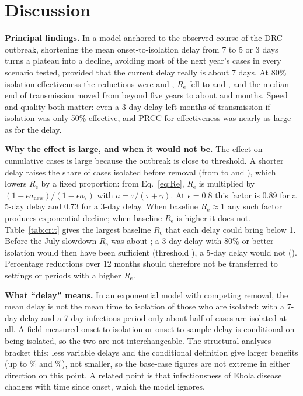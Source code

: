 \documentclass[11pt,a4paper]{article}
\newcommand{\Rt}{R_{\mathrm{e}}}
\begin{document}
\section{Discussion}
\textbf{Principal findings.} In a model anchored to the observed course of the DRC outbreak, shortening the mean onset-to-isolation delay from 7 to 5 or 3 days turns a plateau into a decline, avoiding most of the next year's cases in every scenario tested, provided that the current delay really is about 7 days. At 80\% isolation effectiveness the reductions were \pctMedEightyFive{} and \pctMedEightyThree, $\Rt$ fell to \ReMedEightyFive{} and \ReMedEightyThree, and the median end of transmission moved from beyond five years to about \durEightyFive{} and \durEightyThree{} months. Speed and quality both matter: even a 3-day delay left \durFiftyThree{} months of transmission if isolation was only 50\% effective, and PRCC for effectiveness was nearly as large as for the delay.

\textbf{Why the effect is large, and when it would not be.} The effect on cumulative cases is large because the outbreak is close to threshold. A shorter delay raises the share of cases isolated before removal (from \aIsoSeven{} to \aIsoFive{} and \aIsoThree), which lowers $\Rt$ by a fixed proportion: from Eq.~\eqref{eq:Re}, $\Rt$ is multiplied by $(1-\epsilon a_{\text{new}})/(1-\epsilon a_{7})$ with $a=\tau/(\tau+\gamma)$. At $\epsilon=0.8$ this factor is 0.89 for a 5-day delay and 0.73 for a 3-day delay. When baseline $\Rt\approx1$ any such factor produces exponential decline; when baseline $\Rt$ is higher it does not. Table~\ref{tab:crit} gives the largest baseline $\Rt$ that each delay could bring below 1. Before the July slowdown $\Rt$ was about \fitBReBeforeMed; a 3-day delay with 80\% or better isolation would then have been sufficient (threshold \critReEightyThree), a 5-day delay would not (\critReEightyFive). Percentage reductions over 12 months should therefore not be transferred to settings or periods with a higher $\Rt$.

\begin{table}[H]\centering\small
\caption{Largest baseline reproduction number (with a 7-day delay) that a new delay can bring below 1, from Eq.~\eqref{eq:Re} with $\gamma=1/7$.}\label{tab:crit}
\end{table}

\textbf{What ``delay'' means.} In an exponential model with competing removal, the mean delay is not the mean time to isolation of those who are isolated: with a 7-day delay and a 7-day infectious period only about half of cases are isolated at all. A field-measured onset-to-isolation or onset-to-sample delay is conditional on being isolated, so the two are not interchangeable. The structural analyses bracket this: less variable delays and the conditional definition give larger benefits (up to \varCondFive\% and \varCondThree\%), not smaller, so the base-case figures are not extreme in either direction on this point. A related point is that infectiousness of Ebola disease changes with time since onset, which the model ignores.
\end{document}
